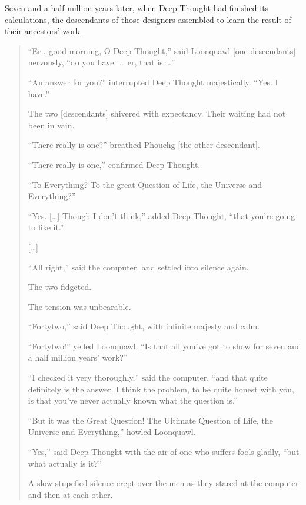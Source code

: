\documentclass[letterpaper,10pt,english]{jupyterBook}
\begin{document}
\sphinxAtStartPar
Seven and a half million years later, when Deep Thought had  finished its calculations, the descendants of those designers assembled to learn the result of their ancestors’ work.
\begin{quote}

\sphinxAtStartPar
“Er …good morning, O Deep Thought,” said Loonquawl {[}one descendants{]} nervously, “do you have … er, that is …”

\sphinxAtStartPar
“An answer for you?” interrupted Deep Thought majestically. “Yes. I have.”

\sphinxAtStartPar
The two {[}descendants{]} shivered with expectancy. Their waiting had not been in vain.

\sphinxAtStartPar
“There really is one?” breathed Phouchg {[}the other descendant{]}.

\sphinxAtStartPar
“There really is one,” confirmed Deep Thought.

\sphinxAtStartPar
“To Everything? To the great Question of Life, the Universe and Everything?”

\sphinxAtStartPar
“Yes. {[}…{]} Though I don’t think,” added Deep Thought, “that you’re going to like it.”

\sphinxAtStartPar
{[}…{]}

\sphinxAtStartPar
“All right,” said the computer, and settled into silence again.

\sphinxAtStartPar
The two fidgeted.

\sphinxAtStartPar
The tension was unbearable.

\sphinxAtStartPar
“Forty\sphinxhyphen{}two,” said Deep Thought, with infinite majesty and calm.

\sphinxAtStartPar
“Forty\sphinxhyphen{}two!” yelled Loonquawl. “Is that all you’ve got to show for seven and a half million years’ work?”

\sphinxAtStartPar
“I checked it very thoroughly,” said the computer, “and that quite definitely is the answer. I think the problem, to be quite honest with you, is that you’ve never actually known what the question is.”

\sphinxAtStartPar
“But it was the Great Question! The Ultimate Question of Life, the Universe and Everything,” howled Loonquawl.

\sphinxAtStartPar
“Yes,” said Deep Thought with the air of one who suffers fools gladly, “but what actually is it?”

\sphinxAtStartPar
A slow stupefied silence crept over the men as they stared at the computer and then at each other.


\end{quote}
\end{document}
